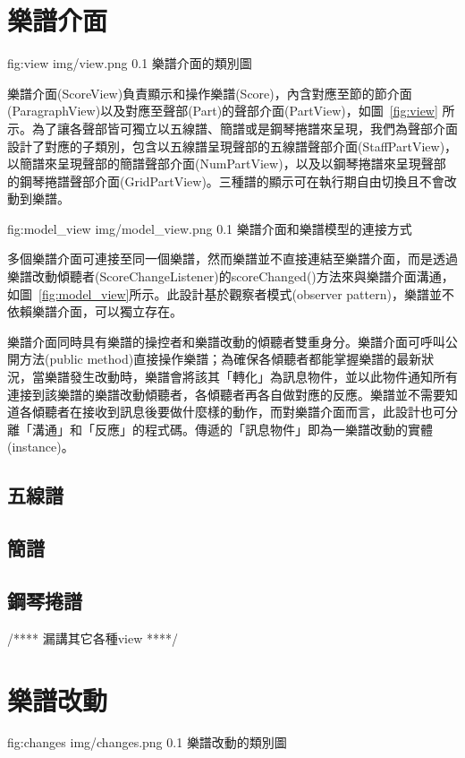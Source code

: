 \documentclass[12pt,a4paper,oneside]{report}
\begin{document}
\section{樂譜介面}


\figurewithcaption
{fig:view}
{img/view.png}
{0.1}
{樂譜介面的類別圖}

樂譜介面(ScoreView)負責顯示和操作樂譜(Score)，內含對應至節的節介面(ParagraphView)以及對應至聲部(Part)的聲部介面(PartView)，如圖~\ref{fig:view} 所示。為了讓各聲部皆可獨立以五線譜、簡譜或是鋼琴捲譜來呈現，我們為聲部介面設計了對應的子類別，包含以五線譜呈現聲部的五線譜聲部介面(StaffPartView)，以簡譜來呈現聲部的簡譜聲部介面(NumPartView)，以及以鋼琴捲譜來呈現聲部的鋼琴捲譜聲部介面(GridPartView)。三種譜的顯示可在執行期自由切換且不會改動到樂譜。

\figurewithcaption
{fig:model_view}
{img/model_view.png}
{0.1}
{樂譜介面和樂譜模型的連接方式}

多個樂譜介面可連接至同一個樂譜，然而樂譜並不直接連結至樂譜介面，而是透過樂譜改動傾聽者(ScoreChangeListener)的scoreChanged()方法來與樂譜介面溝通，如圖~\ref{fig:model_view}所示。此設計基於觀察者模式(observer pattern)\cite{designPatterns}，樂譜並不依賴樂譜介面，可以獨立存在。

樂譜介面同時具有樂譜的操控者和樂譜改動的傾聽者雙重身分。樂譜介面可呼叫公開方法(public method)直接操作樂譜；為確保各傾聽者都能掌握樂譜的最新狀況，當樂譜發生改動時，樂譜會將該其「轉化」為訊息物件，並以此物件通知所有連接到該樂譜的樂譜改動傾聽者，各傾聽者再各自做對應的反應。樂譜並不需要知道各傾聽者在接收到訊息後要做什麼樣的動作，而對樂譜介面而言，此設計也可分離「溝通」和「反應」的程式碼。傳遞的「訊息物件」即為一樂譜改動的實體(instance)。

\subsection{五線譜}
\subsection{簡譜}
\subsection{鋼琴捲譜}
/****
漏講其它各種view
****/

\section{樂譜改動}

\figurewithcaption
{fig:changes}
{img/changes.png}
{0.1}
{樂譜改動的類別圖}
\end{document}
